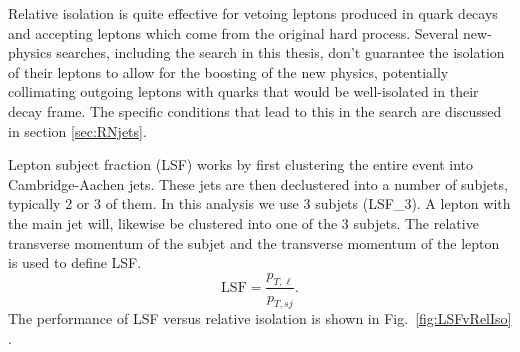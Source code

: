 Relative isolation is quite effective for vetoing leptons produced in quark decays and accepting leptons which come from the original hard process. Several new-physics searches, including the \WR search in this thesis, don't guarantee the isolation of their leptons to allow for the boosting of the new physics, potentially collimating outgoing leptons with quarks that would be well-isolated in their decay frame.  The specific conditions that lead to this in the \WR search are discussed in section \ref{sec:RNjets}.

Lepton subject fraction (LSF) works by first clustering the entire event into Cambridge-Aachen jets.  These jets are then declustered into a number of subjets, typically 2 or 3 of them. In this analysis we use 3 subjets (LSF_{3}).  A lepton with the main jet will, likewise be clustered into one of the 3 subjets. The relative transverse momentum of the subjet and the transverse momentum of the lepton is used to define LSF.
\begin{equation}
    \label{eq:LSF}
    \mathrm{LSF}
    =
    \frac{p_{T,\ell}}{p_{T,sj}}.
\end{equation}
The performance of LSF versus relative isolation is shown in Fig.~\ref{fig:LSFvRelIso} \cite{PHPaperLSF}.

